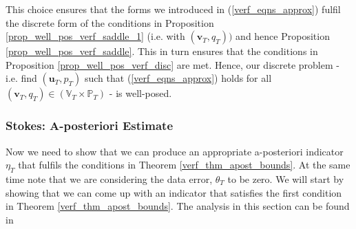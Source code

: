 \documentclass[12pt,a4paper]{article}
\theoremstyle{definition}
\begin{document}
This choice ensures that the forms we introduced in (\ref{verf_eqns_approx}) fulfil the discrete form of the conditions in Proposition \ref{prop_well_pos_verf_saddle_1} (i.e. with $(\textbf{v}_T,q_T))$ and hence Proposition \ref{prop_well_pos_verf_saddle}.  This in turn ensures that the conditions in Proposition \ref{prop_well_pos_verf_disc} are met.  Hence, our discrete problem - i.e. find $\left(\textbf{u}_T, p_T\right)$ such that (\ref{verf_eqns_approx}) holds for all $\left(\textbf{v}_T,q_T\right)\in \left(\mathbb{V}_T\times \mathbb{P}_T\right)$ - is well-posed.

\subsubsection{Stokes: A-posteriori Estimate}\label{a_posteriori_stokes}

Now we need to show that we can produce an appropriate a-posteriori indicator $\eta_T$ that fulfils the conditions in Theorem \ref{verf_thm_apost_bounds}.  At the same time note that we are considering the data error, $\theta_T$ to be zero.  We will start by showing that we can come up with an indicator that satisfies the first condition in Theorem \ref{verf_thm_apost_bounds}.    The analysis in this section can be found in \cite[\S4.10.3]{verfurth2013posteriori}
\end{document}
